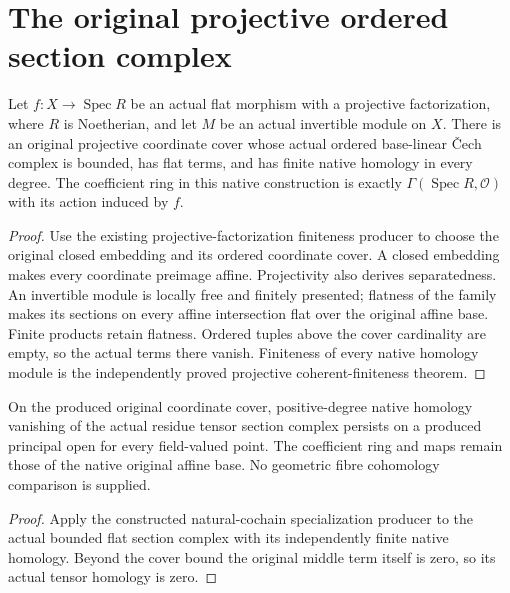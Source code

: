 \section{The original projective ordered section complex}

\begin{lemma}
\label{lem:kn-derived-projective-coordinate-complex}
\leanok
Let $f:X\to\operatorname{Spec}R$ be an actual flat morphism with a
projective factorization, where $R$ is Noetherian, and let $M$ be an
actual invertible module on $X$.  There is an original projective
coordinate cover whose actual ordered base-linear \v{C}ech complex
is bounded, has flat terms, and has finite native homology in every
degree.  The coefficient ring in this native construction is exactly
$\Gamma(\operatorname{Spec}R,\mathcal O)$ with its action induced by $f$.
\end{lemma}
\begin{proof}
Use the existing projective-factorization finiteness producer to choose
the original closed embedding and its ordered coordinate cover.  A
closed embedding makes every coordinate preimage affine.  Projectivity
also derives separatedness.  An invertible module is locally free and
finitely presented; flatness of the family makes its sections on every
affine intersection flat over the original affine base.  Finite
products retain flatness.  Ordered tuples above the cover cardinality
are empty, so the actual terms there vanish.  Finiteness of every
native homology module is the independently proved projective
coherent-finiteness theorem.
\end{proof}

\begin{corollary}
\label{cor:kn-derived-projective-coordinate-tensor-specialization}
\leanok
On the produced original coordinate cover, positive-degree native
homology vanishing of the actual residue tensor section complex
persists on a produced principal open for every field-valued point.
The coefficient ring and maps remain those of the native original
affine base.  No geometric fibre cohomology comparison is supplied.
\end{corollary}
\begin{proof}
Apply the constructed natural-cochain specialization producer to
the actual bounded flat section complex with its independently
finite native homology.  Beyond the cover bound the original
middle term itself is zero, so its actual tensor homology is zero.
\end{proof}

